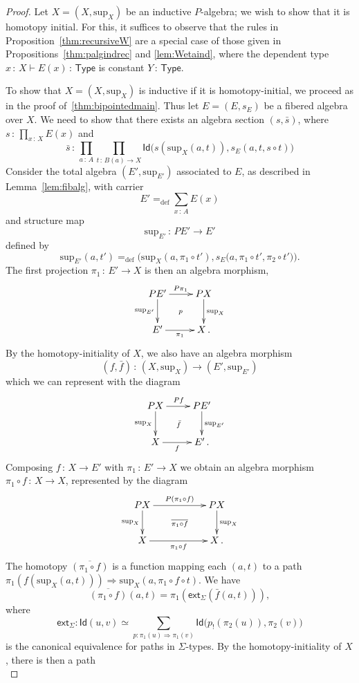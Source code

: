 \documentclass[10pt,a4paper,oneside,reqno]{amsart}
\theoremstyle{mythm}
\theoremstyle{mydef}
\theoremstyle{myrmk}
\newcommand{\defeq}{=_{\mathrm{def}}}
\newcommand{\co}{\,{:}\,}
\newcommand{\com}{\circ}
\newcommand{\ext}{\mathsf{ext}}
\newcommand{\idtodpair}{\ext_\Sigma}
\newcommand{\Id}{\mathsf{Id}}
\newcommand{\U}{\mathsf{Type}}
\renewcommand{\sup}{\mathrm{sup}}
\begin{document}
\begin{proof}
Let $X = (X, \sup_X)$ be an inductive $P$-algebra; we wish to show that it is homotopy initial.
For this, it suffices to observe that the rules in Proposition~\ref{thm:recursiveW} are a special case of those given in Propositions~\ref{thm:palgindrec} and \ref{lem:Wetaind}, where the dependent type $x \co X \vdash E(x) \co \U$ is constant $Y \co \U$.

To show that $X = (X, \sup_X)$ is inductive if it is homotopy-initial, we proceed as in the proof of~\ref{thm:bipointedmain}. 
Thus let $E = (E, s_E)$ be a fibered algebra over $X$. We need to show that there
exists an algebra section $(s, \bar{s})$, where $s \co \prod_{x \co X} E(x)$ and 
\[ 
\bar{s} \co \prod_{a \co A} \prod_{t \co B(a) \to X} \Id \big( s(\sup_X(a,t)), s_E(a, t, s \circ t) \big)
\]
%
Consider the total algebra $(E', \sup_{E'})$ associated to $E$, as described in Lemma~\ref{lem:fibalg}, with carrier 
\[
E' \defeq \sum_{x \co A} E(x) 
\]
and structure map
\[
\sup_{E'} \co PE' \to E'
\]
defined by
\[
\sup_{E'}(a,t') \defeq \Big(\sup_X(a,\pi_1 \circ t'), s_E\big(a,\pi_1 \circ t', \pi_2 \circ t'\big)\Big) .
\]
The first projection $\pi_1 \co E' \to X$ is then an algebra morphism,
\[
\xymatrix{
PE' \ar[r]^{P\pi_1} \ar[d]_-{\sup_{E'}} \ar@{}[rd]|{p} & PX \ar[d]^{\sup_X} \\ 
E'  \ar[r]_-{\pi_1} & X \, .}
 \]
%
By the homotopy-initiality of $X$, we also have an algebra morphism 
\[
(f, \bar{f}) \co (X, \sup_X)  \to (E', \sup_{E'}) 
\]
which we can represent with the diagram
\[
\xymatrix{
PX \ar[r]^{Pf} \ar[d]_-{\sup_{X}} \ar@{}[rd]|{\bar{f}} & PE' \ar[d]^{\sup_{E'}} \\ 
X  \ar[r]_-{f} & E' \, .}
 \]
%
Composing $f \co X \to E'$ with $\pi_1 \co E' \to X$ we obtain an algebra morphism $\pi_1 \com f \co X \to X$, represented by the diagram
\[
\xymatrix{
PX \ar[rr]^{P(\pi_1 \com f)} \ar[d]_-{\sup_{X}} \ar@{}[rrd]|{\overline{\pi_1 \com f}} && PX \ar[d]^{\sup_{X}} \\ 
X  \ar[rr]_-{\pi_1 \com f} && X \, .}
 \]
%
The homotopy $\overline{(\pi_1 \com f)}$ is a function mapping each $(a,t)$ to
a path $\pi_1(f(\sup_X(a,t))) \Rightarrow \sup_X(a, \pi_1 \circ f \circ t)$. We have
\[
\overline{(\pi_1 \com f)}(a,t) = \pi_1(\idtodpair(\bar{f}(a,t))) ,
\]
where $$\idtodpair : \Id(u,v) \simeq \sum_{p : \pi_1(u) \Rightarrow \pi_1(v)} \Id\big(p_{!}(\pi_2(u)), \pi_2(v)\big)$$ is the canonical equivalence for paths in $\Sigma$-types. 
By the homotopy-initiality of $X$,  there is then a path
\begin{equation*}

\end{equation*}
\end{proof}
\end{document}
